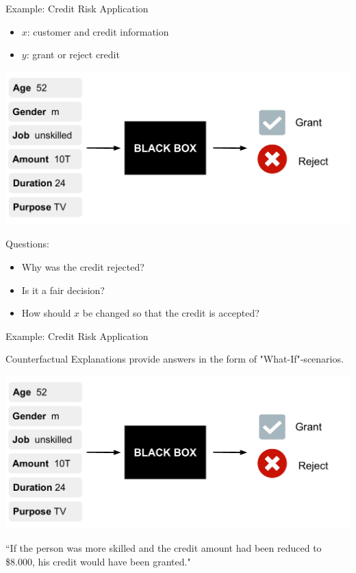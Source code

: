 \documentclass[aspectratio=169]{../latex_main/tntbeamer}  %
\begin{document}
\begin{frame}{Example: Credit Risk Application} 
	\begin{itemize}
		\item $x$: customer and credit information
		\item $y$: grant or reject credit
	\end{itemize}
	\begin{center}\includegraphics[width=0.4\linewidth, page=1]{figure/counterfactuals_credit.pdf} \end{center}
	
	Questions: 
	\begin{itemize}
		\item Why was the credit rejected? 
		\item Is it a fair decision? 
		\item How should $x$ be changed so that the credit is accepted?  
	\end{itemize}
	
	\end{frame}
	\begin{frame}{Example: Credit Risk Application} 
	
	Counterfactual Explanations provide answers in the form of "What-If"-scenarios. 
	\begin{center}\includegraphics[width=0.4\linewidth, page=2]{figure/counterfactuals_credit.pdf} \end{center}
	
	``If the person was more skilled and the credit amount had been reduced to \$8.000, his credit would have been granted."  \\[0.2cm]
	
\end{frame}
\end{document}
